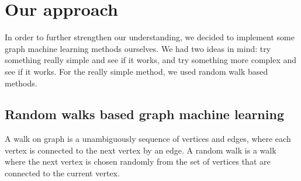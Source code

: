 \section{Our approach}

In order to further strengthen our understanding, we decided to implement some graph machine learning methods ourselves.
We had two ideas in mind: try something really simple and see if it works, and try something more complex and see if it works.
For the really simple method, we used random walk based methods.

\subsection{Random walks based graph machine learning}

A walk on graph is a unambiguously sequence of vertices and edges, where each vertex is connected to the next vertex by an edge.
A random walk is a walk where the next vertex is chosen randomly from the set of vertices that are connected to the current vertex.
